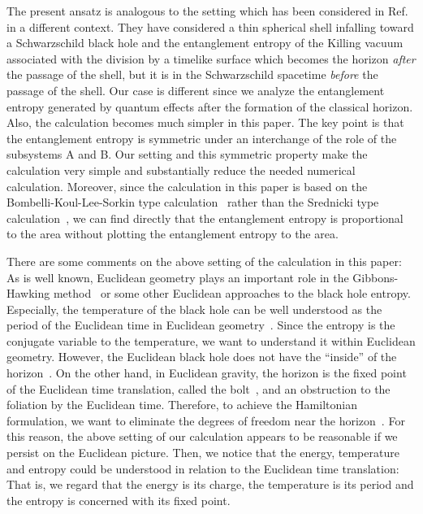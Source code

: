 The present ansatz is analogous to the setting
which has been considered in Ref.\cite{MuSeKo98}
in a different context.
They have considered a thin spherical shell infalling
toward a Schwarzschild black hole and
the entanglement entropy of the Killing vacuum
associated with the division by a timelike surface
which becomes the horizon {\em after} the passage of the shell,
but it is in the Schwarzschild spacetime {\em before}
the passage of the shell.
Our case is different since we analyze the
entanglement entropy generated by quantum effects
after the formation of the classical horizon.
Also, the calculation becomes much simpler
in this paper.
The key point is that the entanglement entropy is symmetric
under an interchange of the role of the subsystems A and B.
Our setting and this symmetric property
make the calculation very simple and
substantially reduce the needed numerical calculation.
Moreover, since the calculation in this paper is
based on the Bombelli-Koul-Lee-Sorkin
type calculation~\cite{BKLS86}
rather than the Srednicki type calculation~\cite{Sredni93},
we can find directly that the entanglement entropy
is proportional to the area
without plotting the entanglement entropy to the area.

There are some comments on the above setting
of the calculation in this paper:
As is well known,
Euclidean geometry plays an important role
in the Gibbons-Hawking method~\cite{GibHaw77,Hawkin79}
or some other Euclidean approaches to the black hole entropy.
Especially,
the temperature of the black hole 
can be well understood as the period of the Euclidean time
in Euclidean geometry~\cite{GibPer,ChrDuf78,TroVan79}.
Since the entropy is the conjugate variable to 
the temperature, we want to understand it
within Euclidean geometry.
However, the Euclidean black hole does not have
the ``inside'' of the horizon~\cite{Hawkin79,Wald84}.
On the other hand,
in Euclidean gravity, the horizon is the fixed point
of the Euclidean time translation,
called the bolt~\cite{GibHaw79},
and an obstruction to the foliation by the Euclidean time.
Therefore, to achieve the Hamiltonian formulation,
we want to eliminate the degrees of freedom near
the horizon~\cite{HawHor96,HawHun99}.
For this reason,
the above setting of our calculation appears to
be reasonable if we persist on the Euclidean picture.
Then, we notice that the energy, temperature and entropy could
be understood in relation to the Euclidean time translation:
That is, we regard that the energy is its charge,
the temperature is its period and
the entropy is concerned with its fixed point.

